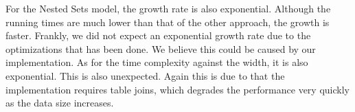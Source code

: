 For the Nested Sets model, the growth rate is also exponential. Although the running times are much lower than that of the other approach, the growth is faster. Frankly, we did not expect an exponential growth rate due to the optimizations that has been done. We believe this could be caused by our implementation. As for the time complexity against the width, it is also exponential. This is also unexpected. Again this is due to that the implementation requires table joins, which degrades the performance very quickly as the data size increases.